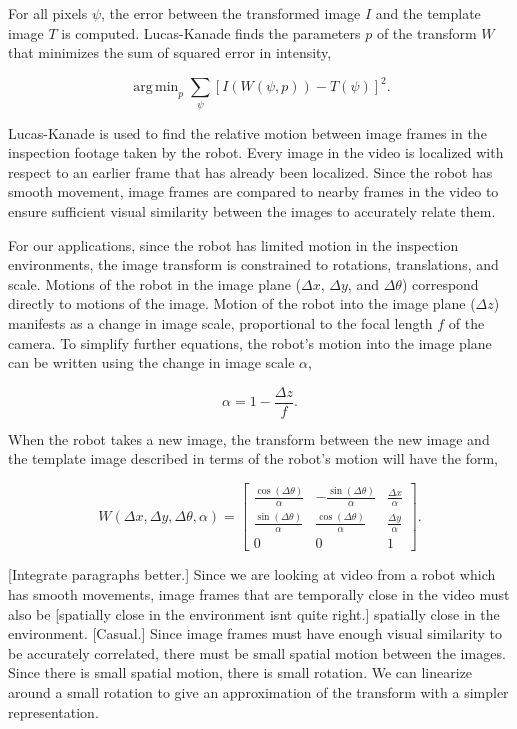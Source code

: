 \documentclass[letterpaper, 10 pt, conference]{ieeeconf}
\DeclareMathOperator*{\argmin}{arg\,min}
\newcommand{\comment}[1]{{\color{red}[#1]}}
\begin{document}
For all pixels $\psi$, the error between the transformed image $I$ and the template image $T$ is computed. Lucas-Kanade finds the parameters $p$ of the transform $W$ that minimizes the sum of squared error in intensity, 

\begin{equation} \label{eq:lkt_min}
    \argmin_p \sum_{\psi} [I(W(\psi, p)) - T(\psi)]^2.
\end{equation}

Lucas-Kanade is used to find the relative motion between image frames in the inspection footage taken by the robot. Every image in the video is localized with respect to an earlier frame that has already been localized. Since the robot has smooth movement, image frames are compared to nearby frames in the video to ensure sufficient visual similarity between the images to accurately relate them.

For our applications, since the robot has limited motion in the inspection environments, the image transform is constrained to rotations, translations, and scale. Motions of the robot in the image plane ($\Delta x$, $\Delta y$, and $\Delta \theta$) correspond directly to motions of the image. Motion of the robot into the image plane ($\Delta z$) manifests as a change in image scale, proportional to the focal length $f$ of the camera. To simplify further equations, the robot's motion into the image plane can be written using the change in image scale $\alpha$,

\begin{equation} \label{eq:z_motion_conversion}
	\alpha = 1 - \frac{\Delta z}{f}.
\end{equation}

When the robot takes a new image, the transform between the new image and the template image described in terms of the robot's motion will have the form,

\begin{equation*}
W(\Delta x, \Delta y, \Delta \theta, \alpha) = \begin{bmatrix} \frac{\cos(\Delta \theta)}{\alpha} & -\frac{\sin(\Delta \theta)}{\alpha} & \frac{\Delta x}{\alpha} \\ \frac{\sin(\Delta \theta)}{\alpha} & \frac{\cos(\Delta \theta)}{\alpha} & \frac{\Delta y}{\alpha} \\ 0 & 0 & 1 \end{bmatrix}.
\end{equation*}

\comment{Integrate paragraphs better.} Since we are looking at video from a robot which has smooth movements, image frames that are temporally close in the video must also be \comment{spatially close in the environment isnt quite right.} spatially close in the environment. 
\comment{Casual.} Since image frames must have enough visual similarity to be accurately correlated, there must be small spatial motion between the images. Since there is small spatial motion, there is small rotation. We can linearize around a small rotation to give an approximation of the transform with a simpler representation.
\end{document}
